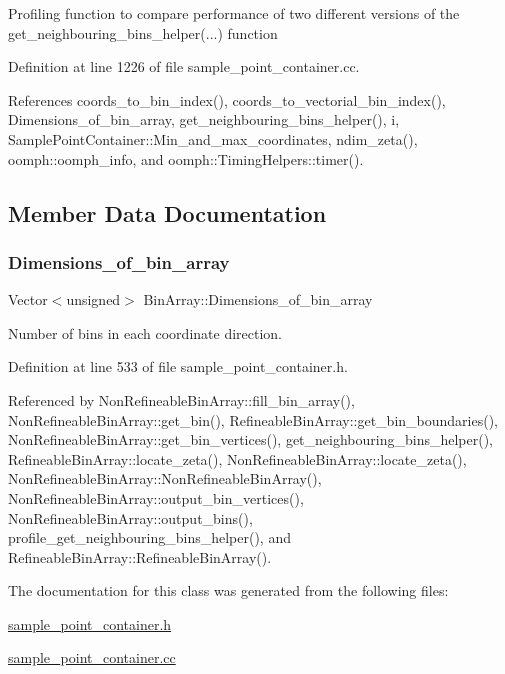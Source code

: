 Profiling function to compare performance of two different versions of the get\+\_\+neighbouring\+\_\+bins\+\_\+helper(...) function 

Definition at line 1226 of file sample\+\_\+point\+\_\+container.\+cc.



References coords\+\_\+to\+\_\+bin\+\_\+index(), coords\+\_\+to\+\_\+vectorial\+\_\+bin\+\_\+index(), Dimensions\+\_\+of\+\_\+bin\+\_\+array, get\+\_\+neighbouring\+\_\+bins\+\_\+helper(), i, Sample\+Point\+Container\+::\+Min\+\_\+and\+\_\+max\+\_\+coordinates, ndim\+\_\+zeta(), oomph\+::oomph\+\_\+info, and oomph\+::\+Timing\+Helpers\+::timer().



\subsection{Member Data Documentation}
\mbox{\label{classBinArray_aaab4005f8563e42df5fc8e7ac626fedc}} 
\subsubsection{\texorpdfstring{Dimensions\+\_\+of\+\_\+bin\+\_\+array}{Dimensions\_of\_bin\_array}}
{\footnotesize\ttfamily Vector$<$unsigned$>$ Bin\+Array\+::\+Dimensions\+\_\+of\+\_\+bin\+\_\+array\hspace{0.3cm}{\ttfamily [protected]}}



Number of bins in each coordinate direction. 



Definition at line 533 of file sample\+\_\+point\+\_\+container.\+h.



Referenced by Non\+Refineable\+Bin\+Array\+::fill\+\_\+bin\+\_\+array(), Non\+Refineable\+Bin\+Array\+::get\+\_\+bin(), Refineable\+Bin\+Array\+::get\+\_\+bin\+\_\+boundaries(), Non\+Refineable\+Bin\+Array\+::get\+\_\+bin\+\_\+vertices(), get\+\_\+neighbouring\+\_\+bins\+\_\+helper(), Refineable\+Bin\+Array\+::locate\+\_\+zeta(), Non\+Refineable\+Bin\+Array\+::locate\+\_\+zeta(), Non\+Refineable\+Bin\+Array\+::\+Non\+Refineable\+Bin\+Array(), Non\+Refineable\+Bin\+Array\+::output\+\_\+bin\+\_\+vertices(), Non\+Refineable\+Bin\+Array\+::output\+\_\+bins(), profile\+\_\+get\+\_\+neighbouring\+\_\+bins\+\_\+helper(), and Refineable\+Bin\+Array\+::\+Refineable\+Bin\+Array().



The documentation for this class was generated from the following files\+:\begin{DoxyCompactItemize}
\item 
\hyperlink{sample__point__container_8h}{sample\+\_\+point\+\_\+container.\+h}\item 
\hyperlink{sample__point__container_8cc}{sample\+\_\+point\+\_\+container.\+cc}\end{DoxyCompactItemize}
